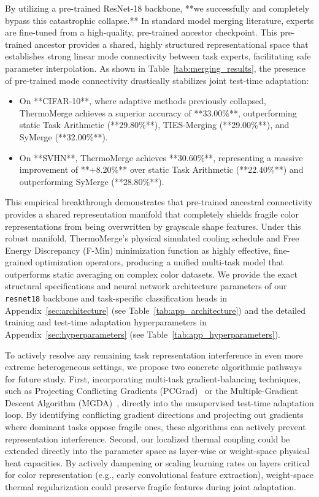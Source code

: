 By utilizing a pre-trained ResNet-18 backbone, **we successfully and completely bypass this catastrophic collapse.** In standard model merging literature, experts are fine-tuned from a high-quality, pre-trained ancestor checkpoint. This pre-trained ancestor provides a shared, highly structured representational space that establishes strong linear mode connectivity between task experts, facilitating safe parameter interpolation. As shown in Table~\ref{tab:merging_results}, the presence of pre-trained mode connectivity drastically stabilizes joint test-time adaptation:
\begin{itemize}
    \item On **CIFAR-10**, where adaptive methods previously collapsed, ThermoMerge achieves a superior accuracy of **33.00\%**, outperforming static Task Arithmetic (**29.80\%**), TIES-Merging (**29.00\%**), and SyMerge (**32.00\%**).
    \item On **SVHN**, ThermoMerge achieves **30.60\%**, representing a massive improvement of **+8.20\%** over static Task Arithmetic (**22.40\%**) and outperforming SyMerge (**28.80\%**).
\end{itemize}
This empirical breakthrough demonstrates that pre-trained ancestral connectivity provides a shared representation manifold that completely shields fragile color representations from being overwritten by grayscale shape features. Under this robust manifold, ThermoMerge's physical simulated cooling schedule and Free Energy Discrepancy (F-Min) minimization function as highly effective, fine-grained optimization operators, producing a unified multi-task model that outperforms static averaging on complex color datasets. We provide the exact structural specifications and neural network architecture parameters of our \texttt{resnet18} backbone and task-specific classification heads in Appendix~\ref{sec:architecture} (see Table~\ref{tab:app_architecture}) and the detailed training and test-time adaptation hyperparameters in Appendix~\ref{sec:hyperparameters} (see Table~\ref{tab:app_hyperparameters}).

To actively resolve any remaining task representation interference in even more extreme heterogeneous settings, we propose two concrete algorithmic pathways for future study. First, incorporating multi-task gradient-balancing techniques, such as Projecting Conflicting Gradients (PCGrad)~\cite{yu2020gradient} or the Multiple-Gradient Descent Algorithm (MGDA)~\cite{sener2018multi}, directly into the unsupervised test-time adaptation loop. By identifying conflicting gradient directions and projecting out gradients where dominant tasks oppose fragile ones, these algorithms can actively prevent representation interference. Second, our localized thermal coupling could be extended directly into the parameter space as layer-wise or weight-space physical heat capacities. By actively dampening or scaling learning rates on layers critical for color representation (e.g., early convolutional feature extraction), weight-space thermal regularization could preserve fragile features during joint adaptation.

